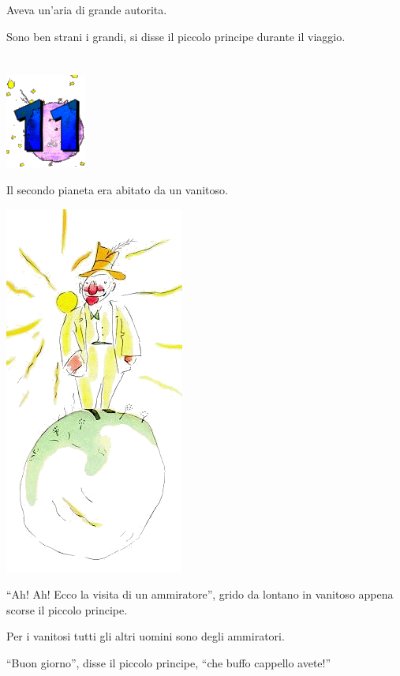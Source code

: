 \documentclass[11pt]{scrbook}
\begin{document}
Aveva un'aria di grande autorita.

Sono ben strani i grandi, si disse il piccolo principe durante il
viaggio.

\chapter{}
\begin{center}
\includegraphics{img/chapter11}
\end{center}

Il secondo pianeta era abitato da un vanitoso.

\begin{center}
\includegraphics{img/11a}
\end{center}

``Ah! Ah! Ecco la visita di un ammiratore'', grido da lontano in
vanitoso appena scorse il piccolo principe.

Per i vanitosi tutti gli altri uomini sono degli ammiratori.

``Buon giorno'', disse il piccolo principe, ``che buffo cappello
avete!''
\end{document}
